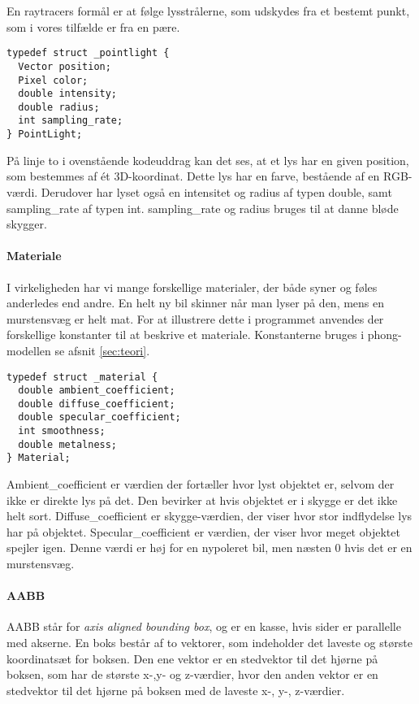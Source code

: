 En raytracers formål er at følge lysstrålerne, som udskydes fra et bestemt punkt, som i vores tilfælde er fra en pære. 

\begin{lstlisting}[style=Cstyle, caption=Struct til light]
typedef struct _pointlight {
  Vector position;
  Pixel color;
  double intensity;
  double radius;
  int sampling_rate;
} PointLight;
\end{lstlisting}

På linje to i ovenstående kodeuddrag kan det ses, at et lys har en given position, som bestemmes af ét 3D-koordinat. Dette lys har en farve, bestående af en RGB-værdi. Derudover har lyset også en intensitet og radius af typen double, samt sampling\_rate af typen int. sampling\_rate og radius bruges til at danne bløde skygger.

\paragraph{Materiale}
I virkeligheden har vi mange forskellige materialer, der både syner og føles anderledes end andre. En helt ny bil skinner når man lyser på den, mens en murstensvæg er helt mat. For at illustrere dette i programmet anvendes der forskellige konstanter til at beskrive et materiale. Konstanterne bruges i phong-modellen se afsnit \ref{sec:teori}.

\begin{lstlisting}[style=Cstyle, caption=Struct til Material]
typedef struct _material {
  double ambient_coefficient;
  double diffuse_coefficient;
  double specular_coefficient;
  int smoothness;
  double metalness; 
} Material;
\end{lstlisting}

Ambient\_coefficient er værdien der fortæller hvor lyst objektet er, selvom der ikke er direkte lys på det. Den bevirker at hvis objektet er i skygge er det ikke helt sort.
Diffuse\_coefficient er skygge-værdien, der viser hvor stor indflydelse lys har på objektet. 
Specular\_coefficient er værdien, der viser hvor meget objektet spejler igen. Denne værdi er høj for en nypoleret bil, men næsten 0 hvis det er en murstensvæg.

\paragraph{AABB}
AABB står for \textit{axis aligned bounding box}, og er en kasse, hvis sider er parallelle med akserne. En boks består af to vektorer, som indeholder det laveste og største koordinatsæt for boksen. Den ene vektor er en stedvektor til det hjørne på boksen, som har de største x-,y- og z-værdier, hvor den anden vektor er en stedvektor til det hjørne på boksen med de laveste x-, y-, z-værdier. 

